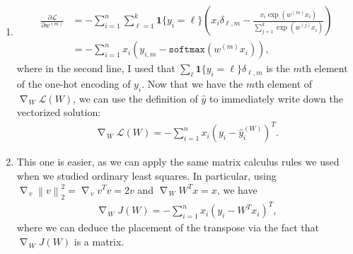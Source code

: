 \documentclass{article}
\newcommand{\norm}[1]{\left\|#1\right\|}
\DeclareMathOperator{\grad}{\nabla\!}
\begin{document}
\begin{enumerate}
        \item 
        \begin{align*}
                \frac{\partial \mathcal{L}}{\partial w^{(m)}} 
                &= - \sum_{i=1}^n \sum_{\ell=1}^k \mathbf{1}\{y_i=\ell\} \left( x_i \delta_{\ell,m} - \frac{x_i \exp(w^{(m)}x_i)}{\sum_{j=1}^k \exp(w^{(j)} x_i)} \right) \\
                &= - \sum_{i=1}^n x_i \left( y_{i,m} - \texttt{softmax}(w^{(m)}x_i) \right),
        \end{align*}
        where in the second line, I used that $\sum_\ell \mathbf{1}\{y_i=\ell\}\delta_{\ell,m}$ is the $m$th element of the one-hot encoding of $y_i$.
        Now that we have the $m$th element of $\grad_W \mathcal{L}(W)$, we can use the definition of $\hat{y}$ to immediately write down the vectorized solution:
        \begin{align*}
                \grad_W \mathcal{L}(W) = - \sum_{i=1}^n x_i (y_i - \hat{y}_i^{(W)})^T.
        \end{align*}

        \item This one is easier, as we can apply the same matrix calculus rules we used when we studied ordinary least squares.
        In particular, using $\grad_v \norm{v}_2^2 = \grad_v v^T v = 2 v$ and $\grad_W W^T x = x$, we have
        \begin{align*}
                \grad_W J(W) = - \sum_{i=1}^n x_i (y_i - W^T x_i)^T,
        \end{align*}
        where we can deduce the placement of the transpose via the fact that $\grad_W J(W)$ is a matrix.


\end{enumerate}
\end{document}
